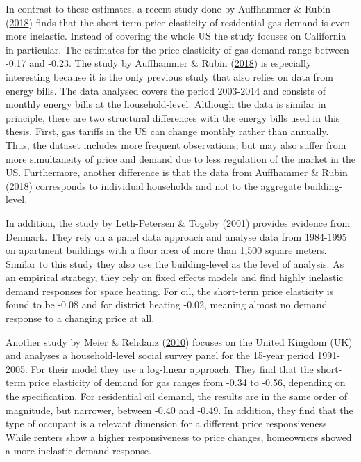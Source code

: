 \documentclass[12pt,twoside]{reedthesis}
\begin{document}
In contrast to these estimates, a recent study done by Auffhammer \& Rubin (\protect\hyperlink{ref-auffhammer_rubin18}{2018}) finds that the short-term price elasticity of residential gas demand is even more inelastic. Instead of covering the whole US the study focuses on California in particular. The estimates for the price elasticity of gas demand range between -0.17 and -0.23. The study by Auffhammer \& Rubin (\protect\hyperlink{ref-auffhammer_rubin18}{2018}) is especially interesting because it is the only previous study that also relies on data from energy bills. The data analysed covers the period 2003-2014 and consists of monthly energy bills at the household-level. Although the data is similar in principle, there are two structural differences with the energy bills used in this thesis. First, gas tariffs in the US can change monthly rather than annually. Thus, the dataset includes more frequent observations, but may also suffer from more simultaneity of price and demand due to less regulation of the market in the US. Furthermore, another difference is that the data from Auffhammer \& Rubin (\protect\hyperlink{ref-auffhammer_rubin18}{2018}) corresponds to individual households and not to the aggregate building-level.

In addition, the study by Leth-Petersen \& Togeby (\protect\hyperlink{ref-leth-petersen_togeby01}{2001}) provides evidence from Denmark. They rely on a panel data approach and analyse data from 1984-1995 on apartment buildings with a floor area of more than 1,500 square meters. Similar to this study they also use the building-level as the level of analysis. As an empirical strategy, they rely on fixed effects models and find highly inelastic demand responses for space heating. For oil, the short-term price elasticity is found to be -0.08 and for district heating -0.02, meaning almost no demand response to a changing price at all.

Another study by Meier \& Rehdanz (\protect\hyperlink{ref-meier_rehdanz10}{2010}) focuses on the United Kingdom (UK) and analyses a household-level social survey panel for the 15-year period 1991-2005. For their model they use a log-linear approach. They find that the short-term price elasticity of demand for gas ranges from -0.34 to -0.56, depending on the specification. For residential oil demand, the results are in the same order of magnitude, but narrower, between -0.40 and -0.49. In addition, they find that the type of occupant is a relevant dimension for a different price responsiveness. While renters show a higher responsiveness to price changes, homeowners showed a more inelastic demand response.
\end{document}
